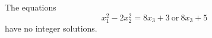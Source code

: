 \begin{proposition}
    The equations
\[
    x_1^2-2x_2^2=8x_3+3\ \text{or}\ 8x_3+5
\]
    have no integer solutions.
\end{proposition}
